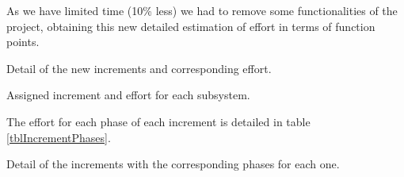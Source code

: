 As we have limited time (10\% less) we had to remove some functionalities of the project, obtaining this new detailed estimation of effort in terms of function points.

\begin{table}[hbtp]
\centering

\caption{Detail of the new increments and corresponding effort.}
\label{tblIncrementsSubsystems}
\end{table}


\begin{table}[hbtp]
\centering

\caption{Assigned increment and effort for each subsystem.}
\label{tblSubsystemsAssignedIncrement}
\end{table}

The effort for each phase of each increment is detailed in table \ref{tblIncrementPhases}.

\begin{table}[hbtp]
\centering

\caption{Detail of the increments with the corresponding phases for each one.}
\label{tblIncrementPhases}
\end{table}
